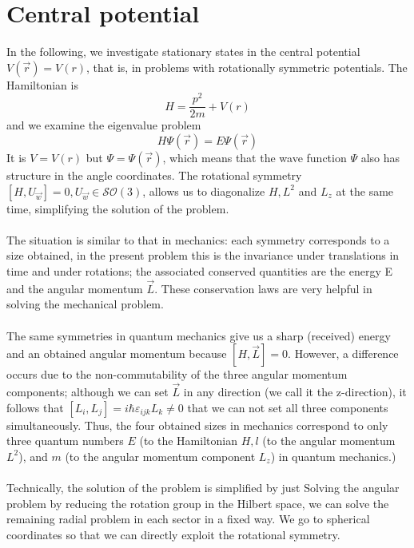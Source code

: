 \chapter{Central potential}

In the following, we investigate stationary states in the central potential $V (\vec{r}) = V (r)$, that is, in problems with rotationally symmetric potentials.
The Hamiltonian is
\begin{equation}
    H=\frac{p^{2}}{2 m}+V(r)
    \end{equation}
and we examine the eigenvalue problem
\begin{equation}
    H \Psi(\vec{r})=E \Psi(\vec{r})
    \end{equation}
It is $V = V (r)$ but $\Psi=\Psi(\vec{r})$, which means that the wave function $\Psi$ also has structure in the angle coordinates. The rotational symmetry $[H,U_{\vec{w}}]=0,U_{\vec{w}}\in\mathcal{SO}(3)$, allows us to diagonalize $H, L^2$ and $L_z$ at the same time, simplifying the solution of the problem. \\\\
The situation is similar to that in mechanics: each symmetry corresponds to a size obtained, in the present problem this is the invariance under translations in time and under rotations; the associated conserved quantities are the energy E and the angular momentum $\vec{L}$. These conservation laws are very helpful in solving the mechanical problem. \\\\
The same symmetries in quantum mechanics give us a sharp (received) energy and an obtained angular momentum because $[H, \vec{L}] = 0$. However, a difference occurs due to the non-commutability of the three angular momentum components; although we can set $\vec{L}$ in any direction (we call it the z-direction), it follows that $[L_i, L_j] = i\hbar \varepsilon_{ijk}L_k\neq 0$ that we can not set all three components simultaneously. Thus, the four obtained sizes in mechanics correspond to only three quantum numbers $E$ (to the Hamiltonian $H, l$ (to the angular momentum $L^2$), and $m$ (to the angular momentum component $L_z$) in quantum mechanics.)\\\\
Technically, the solution of the problem is simplified by just Solving the angular problem by reducing the rotation group in the Hilbert space, we can solve the remaining radial problem in each sector in a fixed way.
We go to spherical coordinates so that we can directly exploit the rotational symmetry.

